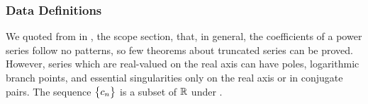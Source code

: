\documentclass[12pt]{article}
\begin{document}


\subsubsection{Data Definitions}\label{sec_datadef}

We quoted from \cite{chang1982} in , the scope section, that,
in general, the coefficients of a power series follow no patterns, so few theorems about truncated
series can be proved. However, series which are real-valued on the real axis can have poles,
logarithmic branch points, and essential singularities only on the real axis or in conjugate pairs.
The sequence $\bigl\{ {c_n} \bigr\}$ is a subset of $\mathbb{R}$ under .
~\newline
\end{document}
